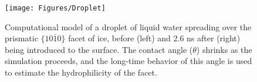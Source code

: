 



\newpage
\begin{figure}
\texttt{[image: Figures/Droplet]}
\caption{\label{fig:Droplet} Computational model of a droplet of
  liquid water spreading over the prismatic $\{10\bar{1}0\}$ facet
  of ice, before (left) and 2.6 ns after (right) being introduced to the
  surface.  The contact angle ($\theta$) shrinks as the simulation
  proceeds, and the long-time behavior of this angle is used to
  estimate the hydrophilicity of the facet.}
\end{figure}




